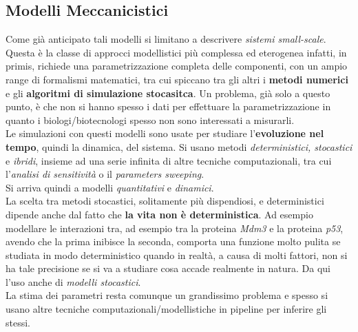 \documentclass[a4paper,12pt, oneside]{book}
\begin{document}
\subsection{Modelli Meccanicistici}
Come già anticipato tali modelli si limitano a descrivere \textit{sistemi
  small-scale}. Questa è la classe di approcci modellistici più complessa ed
eterogenea infatti, in primis, richiede una parametrizzazione completa delle
componenti, con un ampio range di formalismi matematici, tra cui spiccano tra
gli altri i \textbf{metodi numerici} e gli \textbf{algoritmi di simulazione
  stocasitca}. Un problema, già solo 
a questo punto, è che non si hanno spesso i dati per effettuare la
parametrizzazione in quanto i biologi/biotecnologi spesso non sono interessati a
misurarli. \\
Le simulazioni con questi modelli sono usate per studiare l'\textbf{evoluzione
  nel tempo}, quindi la dinamica, del sistema. Si usano metodi
\textit{deterministici, stocastici} e \textit{ibridi}, insieme ad una serie
infinita di altre tecniche computazionali, tra cui l'\textit{analisi di
  sensitività} o il \textit{parameters sweeping}.\\
Si arriva quindi a modelli \textit{quantitativi} e \textit{dinamici}. \\
La scelta tra metodi stocastici, solitamente più dispendiosi, e deterministici
dipende anche dal fatto che \textbf{la vita non è deterministica}. Ad esempio
modellare le interazioni tra, ad esempio tra la proteina \textit{Mdm3} e la
proteina \textit{p53}, avendo che la prima inibisce la seconda, comporta una
funzione molto pulita se studiata in modo deterministico quando in realtà, a
causa di molti fattori, non si ha tale precisione se si va a studiare cosa
accade realmente in natura. Da qui l'uso anche di \textit{modelli stocastici}.\\
La stima dei parametri resta comunque un grandissimo problema e spesso si usano
altre tecniche computazionali/modellistiche in pipeline per inferire gli stessi.
\end{document}
